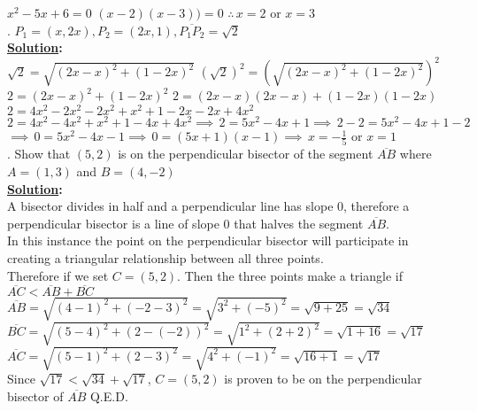\documentclass[10pt,letterpaper]{article}
\begin{document}
\newline$x^2-5x+6=0$
\newline$(x-2)(x-3))=0$
\newline$\therefore\,x=2$ or $x=3$\\
. $P_{1} = (x, 2x), P_{2} = (2x, 1), \overline{P_1P_2} = \sqrt{2}$\\
\textbf{\underline {Solution}:}\\
\newline$\sqrt{2}=\sqrt{(2x-x)^2+(1-2x)^2}$
\newline$(\sqrt{2})^2=(\sqrt{(2x-x)^2+(1-2x)^2})^2$
\newline$2=(2x-x)^2+(1-2x)^2$
\newline$2=(2x-x)(2x-x)+(1-2x)(1-2x)$
\newline$2=4x^2-2x^2-2x^2+x^2+1-2x-2x+4x^2$
\newline$2=4x^2-4x^2+x^2+1-4x+4x^2 \implies\, 2=5x^2-4x+1 \implies\, 2-2=5x^2-4x+1-2$
\newline$\implies\, 0=5x^2-4x-1 \implies\, 0=(5x+1)(x-1) \implies\, x=-\frac{1}{5}$ or $x=1$\\
. Show that $(5,2)$ is on the perpendicular bisector of the segment $\overline{AB}$ where $A = (1,3)$ and $B=(4, -2)$\\
\textbf{\underline {Solution}:}\\
\newline A bisector divides in half and a perpendicular line has slope 0, therefore a perpendicular bisector is a line of slope 0 that halves the segment $\overline{AB}$.\\
\newline In this instance the point on the perpendicular bisector will participate in creating a triangular relationship between all three points.\\
\newline Therefore if we set $C=(5,2)$. Then the three points make a triangle if $\overline{AC} <\overline{AB}+\overline{BC}$\\
\newline$\overline{AB}=\sqrt{(4-1)^2+(-2-3)^2}=\sqrt{3^2+(-5)^2}=\sqrt{9+25}=\sqrt{34}$
\newline$\overline{BC}=\sqrt{(5-4)^2+(2-(-2))^2}=\sqrt{1^2+(2+2)^2}=\sqrt{1+16}=\sqrt{17}$
\newline$\overline{AC}=\sqrt{(5-1)^2+(2-3)^2}=\sqrt{4^2+(-1)^2}=\sqrt{16+1}=\sqrt{17}$\\
\newline Since $\sqrt{17} < \sqrt{34}+\sqrt{17}$, $C=(5,2)$ is proven to be on the perpendicular bisector of $\overline{AB}$ Q.E.D.
\end{document}

